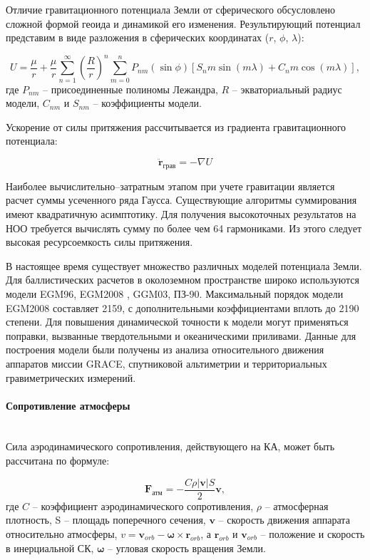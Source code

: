 Отличие гравитационного потенциала Земли от сферического обсусловлено 
сложной формой геоида и динамикой его изменения. Результирующий потенциал представим в виде разложения
в сферических координатах ($r$, $\phi$, $\lambda$):

\begin{equation*}
    U = \frac{\mu}{r} + 
    \frac{\mu}{r} \sum_{n=1}^{\infty} \left(\frac{R}{r}\right)^n 
    \sum_{m=0}^{n} P_{nm}(\sin\phi) \left[ S_nm \sin(m \lambda) + C_nm \cos(m \lambda) \right],
\end{equation*}
где $P_{nm}$ -- присоединенные полиномы Лежандра, $R$ -- экваториальный радиус модели, 
$C_{nm}$ и $S_{nm}$ -- коэффициенты модели.

Ускорение от силы притяжения рассчитывается из градиента гравитационного потенциала:

\begin{equation*}
    \ddot{\mathbf{r}}_{\text{грав}} = -\nabla U
\end{equation*}

Наиболее вычислительно--затратным этапом при учете гравитации является расчет суммы
усеченного ряда Гаусса. Существующие алгоритмы суммирования имеют квадратичную асимптотику.
Для получения высокоточных результатов на НОО требуется вычислять сумму по более чем 64 гармониками.
Из этого следует высокая ресурсоемкость силы притяжения.

В настоящее время существует множество различных моделей потенциала Земли.
Для баллистических расчетов в околоземном пространстве широко используются модели EGM96, EGM2008 \cite{pavlis2012},
GGM03, ПЗ-90.
Максимальный порядок модели EGM2008 составляет 2159, с дополнительными коэффициентами вплоть до 2190 степени.
Для повышения динамической точности к модели могут применяться поправки, вызванные
твердотельными и океаническими приливами. Данные для построения модели были получены из
анализа относительного движения аппаратов миссии GRACE, спутниковой альтиметрии и 
территориальных гравиметрических измерений. 

\paragraph{Сопротивление атмосферы} \mbox{} \\

Сила аэродинамического сопротивления, действующего на КА, может быть рассчитана по формуле:

\begin{equation*}
    \mathbf{F}_{\text{атм}} = - \frac{C \rho |\mathbf{v}| S}{2} \mathbf{v},
\end{equation*}
где $C$ -- коэффициент аэродинамического сопротивления, $\rho$ -- атмосферная плотность, 
S -- площадь поперечного сечения, 
$\mathbf{v}$ -- скорость движения аппарата относительно атмосферы, 
$v = \mathbf{v}_{orb} - \mathbf{\omega} \times \mathbf{r}_{orb}$, а
$\mathbf{r}_{orb}$ и $\mathbf{v}_{orb}$  -- положение и скорость в инерциальной СК,
$\mathbf{\omega}$ -- угловая скорость вращения Земли.

